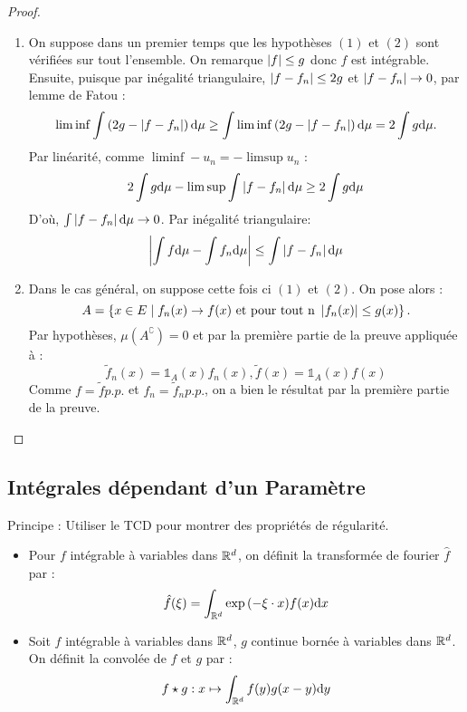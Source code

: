 \documentclass{cours}
\begin{document}
\begin{proof}
    \begin{enumerate}
        \item On suppose dans un premier temps que les hypothèses $(1)$ et $(2)$ sont vérifiées sur tout l'ensemble. On remarque $\left|f\right| \leq g$ donc $f$ est intégrable. \\
              Ensuite, puisque par inégalité triangulaire, $\left|f - f_{n}\right| \leq 2g$ et $\left|f - f_{n}\right| \to 0$, par lemme de Fatou :
              \[
                  \liminf \int \left(2g - \left|f - f_{n}\right|\right) \mathrm{d}\mu \geq \int \liminf \left(2g - \left|f - f_{n}\right|\right) \mathrm{d}\mu = 2 \int g \mathrm{d}\mu.
              \]
              Par linéarité, comme $\liminf -u_{n} = -\limsup u_{n}$ :
              \[
                  2 \int g \mathrm{d}\mu - \limsup \int \left|f - f_{n}\right| \mathrm{d}\mu \geq 2 \int g \mathrm{d}\mu
              \]
              D'où, $\int \left|f - f_{n}\right| \mathrm{d}\mu \to 0$. Par inégalité triangulaire:
              \[
                  \left|\int f \mathrm{d}\mu - \int f_{n}\mathrm{d}\mu\right| \leq \int \left|f - f_{n}\right| \mathrm{d}\mu
              \]
        \item Dans le cas général, on suppose cette fois ci $(1)$ et $(2)$. On pose alors :
              \[
                  A = \left\{x \in E \mid f_{n}(x) \to f(x) \text{ et pour tout n } \left|f_{n}(x)\right|\leq g(x)\right\}.
              \]
              Par hypothèses, $\mu\left(A^{\complement}\right) = 0$ et par la première partie de la preuve appliquée à :
              \[
                  \tilde{f}_{n}(x) = \mathds{1}_{A}(x)f_{n}(x),  \tilde{f}(x) = \mathds{1}_{A}(x)f(x)
              \]
              Comme $f = \tilde{f} p.p.$ et $f_{n} = \tilde{f}_{n} p.p.$, on a bien le résultat par la première partie de la preuve.
    \end{enumerate}
\end{proof}

\subsection{Intégrales dépendant d'un Paramètre}
Principe : Utiliser le TCD pour montrer des propriétés de régularité.
\begin{remark}
    \begin{itemize}
        \item Pour $f$ intégrable à variables dans $\mathbb{R}^{d}$, on définit la transformée de fourier $\hat{f}$ par : \[
                  \hat{f}(\xi) = \int_{\mathbb{R}^{d}} \exp{\left(-\xi \cdot x\right)}f(x)\mathrm{d}x\]
        \item Soit $f$ intégrable à variables dans $\mathbb{R}^{d}$, $g$ continue bornée à variables dans $\mathbb{R}^{d}$. On définit la convolée de $f$ et $g$ par :
              \[f \star g : x \mapsto \int_{\mathbb{R}^{d}} f(y)g(x - y)\mathrm{d}y \]
    \end{itemize}
\end{remark}
\end{document}
